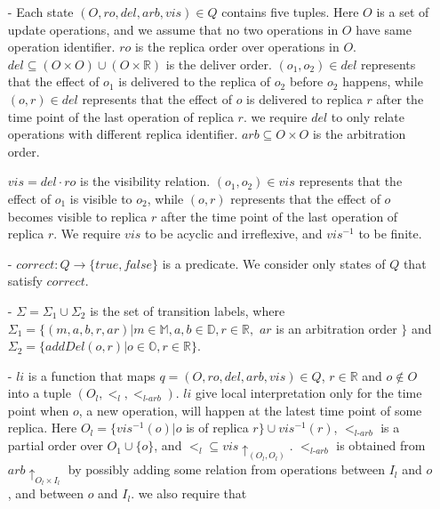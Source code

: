 \begin{itemize}
\setlength{\itemsep}{0.5pt}
\item[-] Each state $(O,ro,del,arb,vis) \in Q$ contains five tuples. Here $O$ is a set of update operations, and we assume that no two operations in $O$ have same operation identifier. $ro$ is the replica order over operations in $O$. $del \subseteq (O \times O) \cup (O \times \mathbb{R})$ is the deliver order. $(o_1,o_2) \in del$ represents that the effect of $o_1$ is delivered to the replica of $o_2$ before $o_2$ happens, while $(o,r) \in del$ represents that the effect of $o$ is delivered to replica $r$ after the time point of the last operation of replica $r$. we require $del$ to only relate operations with different replica identifier. $arb \subseteq O \times O$ is the arbitration order.

    $vis = del \cdot ro$ is the visibility relation. $(o_1,o_2) \in vis$ represents that the effect of $o_1$ is visible to $o_2$, while $(o,r)$ represents that the effect of $o$ becomes visible to replica $r$ after the time point of the last operation of replica $r$. We require $vis$ to be acyclic and irreflexive, and $vis^{-1}$ to be finite.


\item[-] $correct: Q \rightarrow \{ \textit{true},\textit{false} \}$ is a predicate. {\color {red} We consider only states of $Q$ that satisfy $correct$.}

\item[-] $\Sigma = \Sigma_1 \cup \Sigma_2$ is the set of transition labels, where $\Sigma_1 = \{ (m,a,b,r,ar) \vert m \in \mathbb{M}, a,b \in \mathbb{D}, r \in \mathbb{R},$ $ar$ is an arbitration order $\}$ and $\Sigma_2 = \{ addDel(o,r) \vert o \in \mathbb{O}, r \in \mathbb{R} \}$.

\item[-] $li$ is a function that maps $q = (O,ro,del,arb,vis) \in Q$, $r \in \mathbb{R}$ and $o \notin O$ into a tuple $( O_l ,<_l, <_{\textit{l-arb}} )$. $li$ give local interpretation only for the time point when $o$, a new operation, will happen at the latest time point of some replica. Here $O_l = \{ vis^{-1}(o) \vert o$ is of replica $r \} \cup vis^{-1}(r)$, $<_{\textit{l-arb}}$ is a partial order over $O_1 \cup \{ o \}$, and $<_l \subseteq vis \uparrow_{(O_l,O_l)}$. $<_{\textit{l-arb}}$ is obtained from $arb \uparrow_{O_l \times I_l}$ by possibly adding some relation from operations between $I_l$ and $o$, and  between $o$ and $I_l$. we also require that


\end{itemize}
